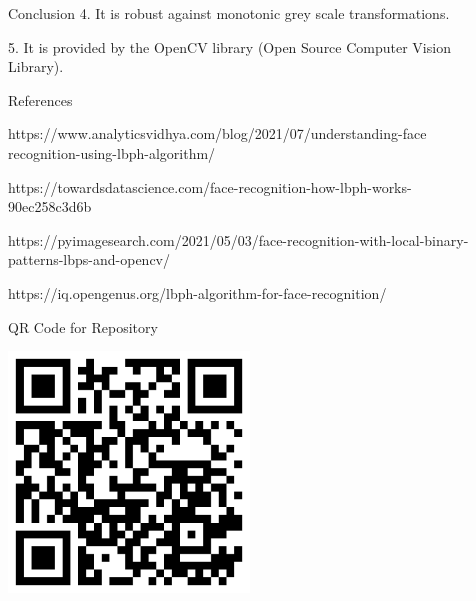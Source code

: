 \documentclass[final]{beamer}
\newlength{\sepwidth}
\newlength{\colwidth}
\newcommand{\separatorcolumn}{\begin{column}{\sepwidth}\end{column}}
\begin{document}
\begin{frame}[t]
\begin{columns}[t]
\begin{column}{\colwidth}
\begin{block}{Conclusion}
4. It is robust against monotonic grey scale transformations.

5. It is provided by the OpenCV library (Open Source Computer Vision Library).

  \end{block}

  \begin{block}{References}

https://www.analyticsvidhya.com/blog/2021/07/understanding-face recognition-using-lbph-algorithm/

https://towardsdatascience.com/face-recognition-how-lbph-works-90ec258c3d6b

https://pyimagesearch.com/2021/05/03/face-recognition-with-local-binary-patterns-lbps-and-opencv/

https://iq.opengenus.org/lbph-algorithm-for-face-recognition/



  \end{block}
  \graphicspath{ {./logos} }
  \begin{block}{QR Code for Repository}
\newline
\newline


  \centering
    \includegraphics[width=0.50\textwidth]{logos/LBPH QR.png}


  \end{block}

\end{column}

\separatorcolumn
\end{columns}
\end{frame}
\end{document}
